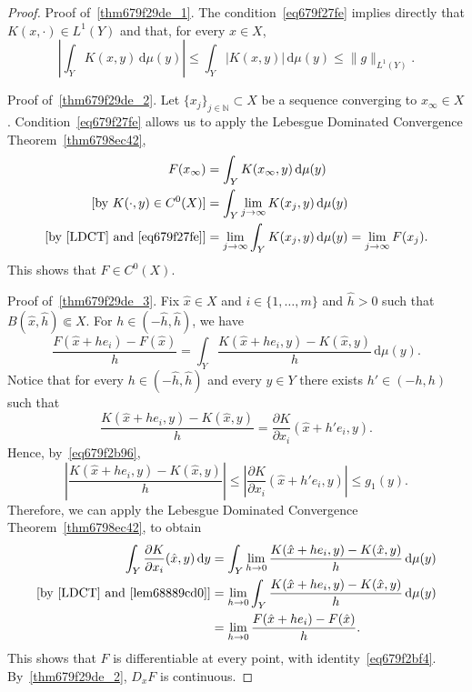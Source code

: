 \documentclass[a4paper,9pt]{amsart}
\newcommand{\N}{\mathbb{N}}	%
\newcommand{\did}{\,\mathrm{d}}	%
\newcommand{\de}{\partial}		%
\theoremstyle{plain}
\theoremstyle{definition}
\theoremstyle{remark}
\begin{document}
\begin{proof}
	Proof of~\ref{thm679f29de_1}.
	The condition~\eqref{eq679f27fe}  implies directly that $K(x,\cdot)\in L^1(Y)$ and that, for every $x\in X$,
	\[
	|\int_Y K(x,y) \did\mu(y)| 
	\le \int_Y |K(x,y)| \did\mu(y) 
	\le \|g\|_{L^1(Y)} .
	\]
	
	Proof of~\ref{thm679f29de_2}.
	Let $\{x_j\}_{j\in\N}\subset X$ be a sequence converging to $x_\infty\in X$.
	Condition~\eqref{eq679f27fe} allows us to apply the Lebesgue Dominated Convergence Theorem~\ref{thm6798ec42},
	\begin{align*}
	F(x_\infty)
	&= \int_Y K(x_\infty,y) \did\mu(y) \\
	[\text{by }K(\cdot,y)\in C^0(X)]
	&= \int_Y  \lim_{j\to\infty} K(x_j,y) \did\mu(y)  \\
	[\text{by \ref{LDCT} and~\eqref{eq679f27fe}}]
	&= \lim_{j\to\infty}\int_Y K(x_j,y) \did\mu(y)  
	= \lim_{j\to\infty} F(x_j).
	\end{align*}	
	This shows that $F\in C^0(X)$.
	
	Proof of~\ref{thm679f29de_3}.	
	Fix $\hat x\in X$ and $i\in\{1,\dots,m\}$ and $\hat h>0$ such that $B(\hat x,\hat h)\Subset X$.
	For $h\in(-\hat h,\hat h)$, we have
	\[
	\frac{F(\hat x + he_i) - F(\hat x)}{h} 
		= \int_Y \frac{ K(\hat x + he_i,y) - K(\hat x,y) }{h} \did\mu(y) .
	\]
	Notice that for every $h\in(-\hat h,\hat h)$ and every $y\in Y$ there exists $h'\in (-h,h)$ such that 
	\[
	\frac{ K(\hat x + he_i,y) - K(\hat x,y) }{h}
	= \frac{\de K}{\de x_i} (\hat x + h'e_i , y) .
	\] 
	Hence, by~\eqref{eq679f2b96},
	\begin{equation}\label{lem68889cd0}
	\left|\frac{ K(\hat x + he_i,y) - K(\hat x,y) }{h}\right| 
	\le \left|	\frac{\de K}{\de x_i} (\hat x + h'e_i , y) \right| 
	\le g_1(y) .
	\end{equation}
	Therefore, we can apply the Lebesgue Dominated Convergence Theorem~\ref{thm6798ec42},
	to obtain
	\begin{align*}
		\int_Y \frac{\de K}{\de x_i}(\hat x,y) \did y 
		&= \int_Y \lim_{h\to0}\frac{ K(\hat x + he_i,y) - K(\hat x,y) }{h} \did\mu(y) \\ 
		[\text{by \ref{LDCT} and~\eqref{lem68889cd0}}]
		&= \lim_{h\to0}\int_Y \frac{ K(\hat x + he_i,y) - K(\hat x,y) }{h} \did\mu(y) \\
		&= \lim_{h\to0}\frac{F(\hat x + he_i) - F(\hat x)}{h} .
	\end{align*}
	This shows that $F$ is differentiable at every point, with identity~\eqref{eq679f2bf4}.
	By~\ref{thm679f29de_2}, $D_xF$ is continuous.
\end{proof}
\end{document}
